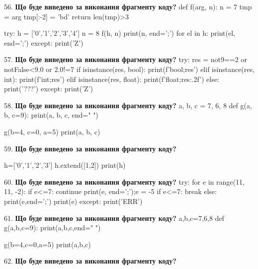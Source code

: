 \documentclass[11pt]{article}
\begin{document}
56. \textbf{Що буде виведено за виконання фрагменту коду?}
def f(arg, n):
    n = 7
    tmp = arg
    tmp[:-2] = 'bd'
    return len(tmp)>3

try:
    h = ['0','1','2','3','4']
    n = 8
    f(h, n)
    print(n, end=';')
    for el in h:
        print(el, end=';')
except:
    print('Z')
\par\vspace{5mm}

57. \textbf{Що буде виведено за виконання фрагменту коду?}
try:
    res = not9==2 or notFalse<9.0 or 2.0!=7
    if isinstance(res, bool):
        print(f'bool;{res}')
    elif isinstance(res, int):
        print(f'int;{res}')
    elif isinstance(res, float):
        print(f'float;{res:.2f}')
    else:
        print('???')
except:
    print('Z')
\par\vspace{5mm}

58. \textbf{Що буде виведено за виконання фрагменту коду?}
a, b, c = 7, 6, 8
def g(a, b, c=9):
    print(a, b, c, end=" ")

g(b=4, c=0, a=5)
print(a, b, c)
\par\vspace{5mm}

59. \textbf{Що буде виведено за виконання фрагменту коду?}

h=['0','1','2','3']
h.extend([1,2])
print(h)

\par\vspace{5mm}

60. \textbf{Що буде виведено за виконання фрагменту коду?}
try:
    for e in range(11, 11, -2):
        if e<=7:
            continue
        print(e, end=';');e = -5
        if e<=7:
            break
    else:
        print(e,end=';')
    print(e)
except:
    print('ERR')
\par\vspace{5mm}

61. \textbf{Що буде виведено за виконання фрагменту коду?}
a,b,c=7,6,8
def g(a,b,c=9):
    print(a,b,c,end=" ")

g(b=4,c=0,a=5)
print(a,b,c)
\par\vspace{5mm}

62. \textbf{Що буде виведено за виконання фрагменту коду?}
\end{document}
